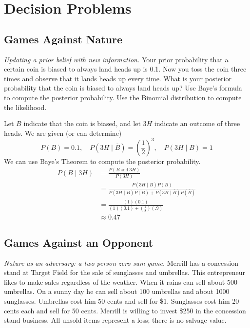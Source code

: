 \chapter{Decision Problems}

\section{Games Against Nature}

\emph{Updating a prior belief with new information.}
Your prior probability that a certain coin is biased to always land
heads up is 0.1. Now you toss the coin three times and observe that it
lands heads up every time. What is your posterior probability that the
coin is biased to always land heads up?  Use Baye's formula to compute
the posterior probability. Use the Binomial distribution to compute
the likelihood.

Let $B$ indicate that the coin is biased, and let $3H$ indicate an
outcome of three heads. We are given (or can determine)
\[
P(B) = 0.1, \quad P(3H \mid \overline{B}) = \left(\frac{1}{2}\right)^3, \quad P(3H \mid B) = 1
\]
We can use Baye's Theorem to compute the posterior probability.
\begin{align*}
P(B \mid 3H) &= \frac{P(B~\text{and}~3H)}{P(3H)} \\
&= \frac{P(3H \mid B)P(B)}{P(3H \mid B)P(B) + P(3H \mid \overline{B})P(\overline{B})} \\
&= \frac{(1)(0.1)}{(1)(0.1) + \left(\frac{1}{8}\right)(.9)} \\
&\approx 0.47
\end{align*}


\section{Games Against an Opponent}

\emph{Nature as an adversary: a two-person zero-sum game.}
Merrill has a concession stand at Target Field for the sale of
sunglasses and umbrellas. This entrepreneur likes to make sales
regardless of the weather.  When it rains can sell about 500
umbrellas.  On a sunny day he can sell about 100 umbrellas and about
1000 sunglasses. Umbrellas cost him 50 cents and sell for \$1.
Sunglasses cost him 20 cents each and sell for 50 cents. Merrill is
willing to invest \$250 in the concession stand business.  All unsold
items represent a loss; there is no salvage value. 

